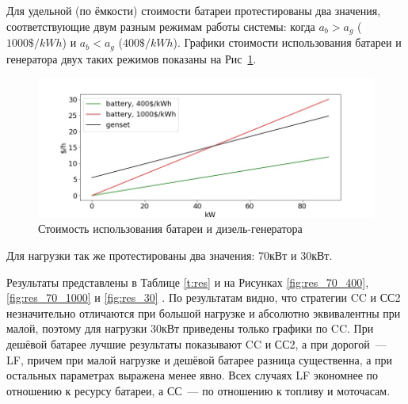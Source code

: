 \documentclass{report}
\begin{document}
Для удельной (по ёмкости) стоимости батареи протестированы два значения, соответствующие двум разным режимам работы системы: когда $a_b > a_g$ ($1000\$/kWh$) и $a_b < a_g$ ($400\$/kWh$).
Графики стоимости использования батареи и генератора двух таких режимов показаны на Рис~\ref{fig:bgcost}.


\begin{figure}[h]
\includegraphics[scale=0.5]{energy_cost.jpeg}
\caption{Стоимость использования батареи и дизель-генератора}
\centering
\label{fig:bgcost}
\end{figure}

\medskip

Для нагрузки так же протестированы два значения: 70кВт и 30кВт.

Результаты представлены в Таблице \ref{t:res} и на Рисунках \ref{fig:res_70_400}, \ref{fig:res_70_1000} и \ref{fig:res_30} .
По результатам видно, что стратегии CC и СС2 незначительно отличаются при большой нагрузке и абсолютно эквивалентны при малой, поэтому для нагрузки 30кВт приведены только графики по CC. 
При дешёвой батарее лучшие результаты показывают CC и СС2, а при дорогой~--- LF, причем при малой нагрузке и дешёвой батарее разница существенна, а при остальных параметрах выражена менее явно.
Всех случаях LF экономнее по отношению к ресурсу батареи, а СС~--- по отношению к топливу и моточасам.
\end{document}
